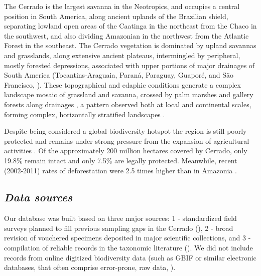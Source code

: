 \documentclass[12pt,openright,oneside,a4paper,english]{abntex2}
\begin{document}
The Cerrado is the largest savanna in the Neotropics, and occupies a central position in South America, along ancient uplands of the Brazilian shield, separating lowland open areas of the Caatinga in the northeast from the Chaco in the southwest, and also dividing Amazonian in the northwest from the Atlantic Forest in the southeast. The Cerrado vegetation is dominated by upland savannas and grasslands, along extensive ancient plateaus, intermingled by peripheral, mostly forested depressions, associated with upper portions of major drainages of South America (Tocantins-Araguaia, Paraná, Paraguay, Guaporé, and São Francisco, \citet{Absaber1998}). These topographical and edaphic conditions generate a complex landscape mosaic of grassland and savanna, crossed by palm marshes and gallery forests along drainages \citep{Eiten1972, Ratter1997}, a pattern observed both at local and continental scales, forming complex, horizontally stratified landscapes \citep{Silva2002, Colli2020}.

Despite being considered a global biodiversity hotspot \citep{Myers2000} the region is still poorly protected and remains under strong pressure from the expansion of agricultural activities \citep{Strassburg2017, Grande2020, Pacheco2021}. Of the approximately 200 million hectares covered by Cerrado, only 19.8\% remain intact and only 7.5\% are legally protected. Meanwhile, recent (2002-2011) rates of deforestation were 2.5 times higher than in Amazonia \citep{Strassburg2017}.

\subsection{\textit{Data sources}}

Our database was built based on three major sources: 1 - standardized field surveys planned to fill previous sampling gaps in the Cerrado (\citealp[see][]{Nogueira2009, Valdujo2012, Carmignotto2022}), 2 - broad revision of vouchered specimens deposited in major scientific collections, and 3 - compilation of reliable records in the taxonomic literature (\citealp[details in][]{Nogueira2009, Valdujo2012, Nogueira2019, Carmignotto2022}). We did not include records from online digitized biodiversity data (such as GBIF or similar electronic databases, that often comprise error-prone, raw data, \citealp[see][and references therein]{Nogueira2019}).
\end{document}
